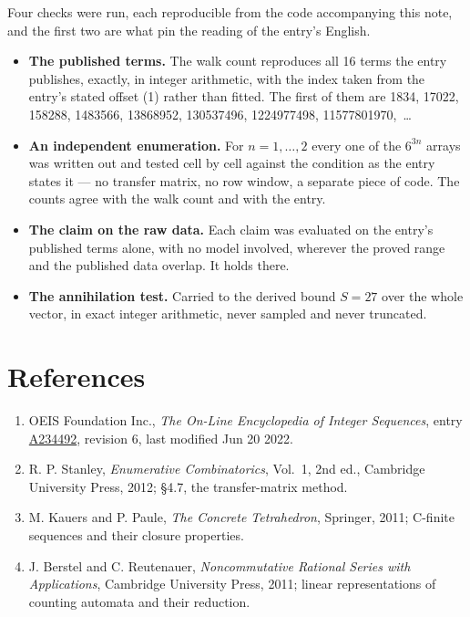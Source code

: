 \documentclass[11pt]{article}
\theoremstyle{definition}
\begin{document}
Four checks were run, each reproducible from the code accompanying this note, and the first two are what pin the reading of the entry's English.

\begin{itemize}

\item {\bfseries The published terms.} The walk count reproduces all 16 terms the entry publishes, exactly, in integer arithmetic, with the index taken from the entry's stated offset (1) rather than fitted. The first of them are 1834, 17022, 158288, 1483566, 13868952, 130537496, 1224977498, 11577801970,~\dots

\item {\bfseries An independent enumeration.} For $n = 1,\dots,2$ every one of the $6^{3n}$ arrays was written out and tested cell by cell against the condition as the entry states it --- no transfer matrix, no row window, a separate piece of code. The counts agree with the walk count and with the entry.

\item {\bfseries The claim on the raw data.} Each claim was evaluated on the entry's published terms alone, with no model involved, wherever the proved range and the published data overlap. It holds there.

\item {\bfseries The annihilation test.} Carried to the derived bound $S = 27$ over the whole vector, in exact integer arithmetic, never sampled and never truncated.

\end{itemize}

\section{References}

\begin{enumerate}

\item OEIS Foundation Inc., \emph{The On-Line Encyclopedia of Integer Sequences}, entry \href{https://oeis.org/A234492}{A234492}, revision 6, last modified Jun 20 2022.

\item R. P. Stanley, \emph{Enumerative Combinatorics}, Vol.~1, 2nd ed., Cambridge University Press, 2012; \S4.7, the transfer-matrix method.

\item M. Kauers and P. Paule, \emph{The Concrete Tetrahedron}, Springer, 2011; C-finite sequences and their closure properties.

\item J. Berstel and C. Reutenauer, \emph{Noncommutative Rational Series with Applications}, Cambridge University Press, 2011; linear representations of counting automata and their reduction.

\end{enumerate}
\end{document}
